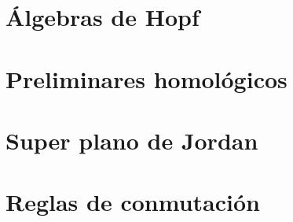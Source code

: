 \documentclass[a4paper,oneside,fleqn,11pt]{report}
\theoremstyle{definition}
\theoremstyle{definition}
\theoremstyle{definition}
\begin{document}
\chapter{Álgebras de Hopf}
\label{hopf}


\chapter{Preliminares homológicos}


\chapter{Super plano de Jordan}
\label{chap3}


\appendix
\chapter{Reglas de conmutación}
\label{apendice}


\end{document}
